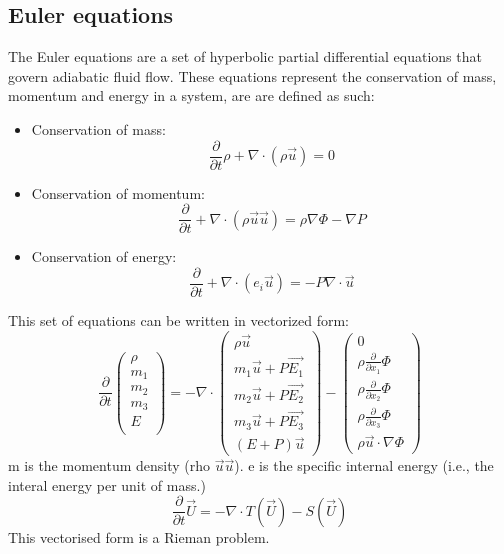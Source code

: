 \documentclass[12pt,a4paper]{report}
\begin{document}
\subsection{Euler equations}
The Euler equations are a set of hyperbolic partial differential equations that govern adiabatic fluid flow. These equations represent the conservation of mass, momentum and energy in a system, are are defined as such:
\begin{itemize}
\item Conservation of mass:
\begin{equation}
\frac{\partial}{\partial t}\rho + \nabla\cdot(\rho\vec{u}) = 0
\end{equation}
\item Conservation of momentum:
\begin{equation}
\frac{\partial}{\partial t}+\nabla\cdot (\rho\vec{u}\vec{u}) = \rho\nabla\Phi - \nabla P
\end{equation}
\item Conservation of energy:
\begin{equation}
\frac{\partial}{\partial t} + \nabla\cdot (e_i\vec{u}) = -P\nabla\cdot\vec{u}
\end{equation}
\end{itemize}
This set of equations can be written in vectorized form:
\begin{equation}
\frac{\partial}{\partial t} \begin{pmatrix}
\rho \\
m_{1} \\
m_{2} \\
m_{3} \\
E \\
\end{pmatrix}
 = -\nabla\cdot
 \begin{pmatrix}
 \rho\vec{u}\\
 m_{1}\vec{u} + P\vec{E_1}\\
 m_{2}\vec{u} + P\vec{E_2}\\
 m_{3}\vec{u} + P\vec{E_3}\\
 (E + P)\vec{u}
 \end{pmatrix}
 -
 \begin{pmatrix}
 0\\
 \rho \frac{\partial}{\partial x_{1}}\Phi\\
 \rho \frac{\partial}{\partial x_{2}}\Phi\\
 \rho \frac{\partial}{\partial x_{3}}\Phi\\
 \rho \vec{u} \cdot \nabla\Phi
 \end{pmatrix}
\end{equation}
m is the momentum density (rho $\vec{u}\vec{u}$).
e is the specific internal energy (i.e., the interal energy per unit of mass.)
\begin{equation}
\frac{\partial}{\partial t}\vec{U} = -\nabla \cdot T(\vec{U}) - S(\vec{U})
\end{equation}
This vectorised form is a Rieman problem.
\end{document}
